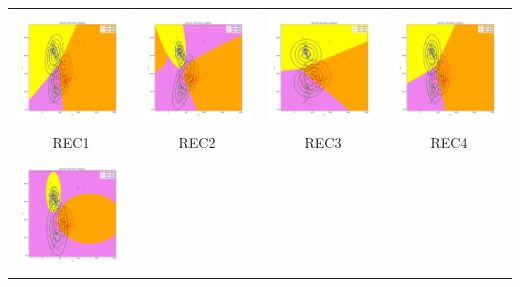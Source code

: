 \documentclass[11pt]{article}
\begin{document}
\begin{center}
  \setlength\tabcolsep{-4pt}
  \begin{tabular}{cccc}
  \includegraphics[width=4.5cm]{classifier/REAL_plots/DecisionBoundary_Case1.png}
  & \includegraphics[width=4.5cm]{classifier/REAL_plots/DecisionBoundary_Case2.png}
  & \includegraphics[width=4.5cm]{classifier/REAL_plots/DecisionBoundary_Case3.png}
  & \includegraphics[width=4.5cm]{classifier/REAL_plots/DecisionBoundary_Case4.png} \\
  REC1 & REC2 & REC3 & REC4\\
  \includegraphics[width=4.5cm]{classifier/REAL_plots/DecisionBoundary_Case5.png}

\end{tabular}
\end{center}
\end{document}
